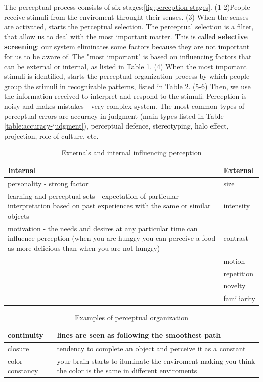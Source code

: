 \documentclass[12pt,article,oneside,a4paper]{memoir}
\begin{document}
The perceptual process consists of six stages:\ref{fig:perception-stages}.
(1-2)People receive stimuli from the enviroment throught their senses.
(3) When the senses are activated, starts the perceptual selection. The perceptual selection is a filter, that allow us to deal with the most important matter. This is called \textbf{selective screening}: our system eliminates some factors because they are not important for us to be aware of. The "most important" is based on influencing factors that can be external or internal, as listed in Table \ref{table:factors-perception}.
(4) When the most important stimuli is identified, starts the perceptual organization process by which people group the stimuli in recognizable patterns, listed in Table  \ref{table:perceptual-organization}.
(5-6) Then, we use the information received to interpret and respond to the stimuli. Perception is noisy and makes mistakes - very complex system. The most common types of perceptual errors are accuracy in judgment (main types listed in Table \ref{table:accuracy-judgment}), perceptual defence, stereotyping, halo effect, projection, role of culture, etc.

\begin{table}
  \begin{tabular}{ p{13cm} |  p{2cm} }
    \hline
    Internal & External \\ \hline
    personality -  strong factor & size \\ \hline
    learning and perceptual sets - expectation of particular interpretation based on past experiences with the same or similar objects & intensity \\ \hline
    motivation - the needs and desires at any particular time can influence perception (when you are hungry you can perceive a food as more delicious than when you are not hungry) & contrast \\ \hline
	 & motion \\ \hline
 	 & repetition \\ \hline
 	 & novelty \\ \hline
     & familiarity \\
    \hline
  \end{tabular}
  \caption{Externals and internal influencing perception}
  \label{table:factors-perception}
\end{table}

\begin{table}
  \begin{tabular}{ l |  p{12.5cm} }
    \hline
    continuity & lines are seen as following the smoothest path \\ \hline
    closure & tendency to complete an object and perceive it as a constant \\ \hline
    color constancy & your brain starts to iluminate the enviroment making you think the color is the same in different enviroments \\
    \hline
  \end{tabular}
  \caption{Examples of perceptual organization}
  \label{table:perceptual-organization}
\end{table}
\end{document}

